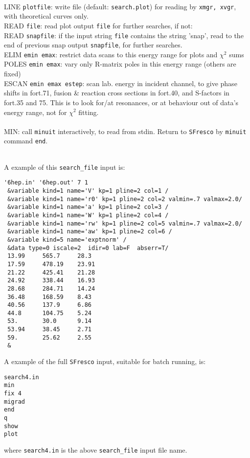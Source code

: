 \documentclass[11pt]{article}
\begin{document}
 \\ LINE {\tt plotfile}: write file (default: {\tt search.plot}) for reading by {\tt xmgr, xvgr},
 with theoretical curves only.
\\ READ {\tt file}: read plot output {\tt file} for further searches, if not:
\\ READ {\tt snapfile}: if the input string {\tt file} contains the string 'snap',
read to the end of previous snap output {\tt snapfile}, for further searches.
\\ ELIM {\tt emin emax}: restrict data scans to this energy range for plots and $\chi^2$ sums
\\ POLES {\tt emin emax}: vary only R-matrix poles in this energy range (others are fixed)
\\ ESCAN {\tt emin emax estep}: scan lab. energy in incident channel, to give
phase shifts in fort.71, fusion \& reaction cross sections in fort.40,
 and S-factors in fort.35 and 75.
This is to look for/at resonances, or at behaviour out of data's energy range,
not for $\chi^2$ fitting.\\
\\ MIN: call {\tt minuit} interactively, to read from stdin.
Return to {\tt SFresco} by {\tt minuit} command {\tt end}.


~\\
\newpage
A example of this {\tt search\_file} input is:
\begin{verbatim}
'6hep.in' '6hep.out' 7 1
 &variable kind=1 name='V' kp=1 pline=2 col=1 /
 &variable kind=1 name='r0' kp=1 pline=2 col=2 valmin=.7 valmax=2.0/
 &variable kind=1 name='a' kp=1 pline=2 col=3 /
 &variable kind=1 name='W' kp=1 pline=2 col=4 /
 &variable kind=1 name='rw' kp=1 pline=2 col=5 valmin=.7 valmax=2.0/
 &variable kind=1 name='aw' kp=1 pline=2 col=6 /
 &variable kind=5 name='exptnorm' /
 &data type=0 iscale=2  idir=0 lab=F  abserr=T/
 13.99     565.7     28.3
 17.59     478.19    23.91
 21.22     425.41    21.28
 24.92     338.44    16.93
 28.68     284.71    14.24
 36.48     168.59    8.43
 40.56     137.9     6.86
 44.8      104.75    5.24
 53.       30.0      9.14
 53.94     38.45     2.71
 59.       25.62     2.55
 &
\end{verbatim}
\normalsize
A example of the full {\tt SFresco} input, suitable for batch running, is:
\begin{verbatim}
search4.in
min
fix 4
migrad
end
q
show
plot
\end{verbatim}
\normalsize
where {\tt search4.in} is the above {\tt search\_file} input file name.
\end{document}
